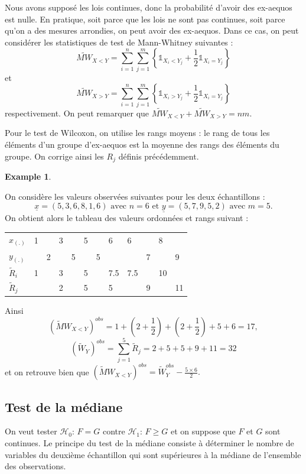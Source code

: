 \documentclass[
]{book}
\theoremstyle{definition}
\theoremstyle{definition}
\newtheorem{example}{Example}[chapter]
\theoremstyle{definition}
\theoremstyle{definition}
\theoremstyle{remark}
\begin{document}
Nous avons supposé les lois continues, donc la probabilité d'avoir des ex-aequos est nulle. En pratique, soit parce que les lois ne sont pas continues, soit parce qu'on a des mesures arrondies, on peut avoir des ex-aequos.
Dans ce cas, on peut considérer les statistiques de test de Mann-Whitney suivantes :
\[ 
    \tilde{MW}_{X<Y} = \sum_{i=1}^n \sum_{j=1}^m \left\{\mathbb{1}_{X_i <Y_j} + \frac 1 2 \mathbb{1}_{X_i =Y_j} \right\}
\]
et
\[ 
    \tilde{MW}_{X>Y} = \sum_{i=1}^n \sum_{j=1}^m \left\{\mathbb{1}_{X_i >Y_j} + \frac 1 2 \mathbb{1}_{X_i =Y_j} \right\}
\]
respectivement. On peut remarquer que \(\tilde{MW}_{X<Y} +\tilde{MW}_{X>Y} =nm\).

Pour le test de Wilcoxon, on utilise les rangs moyens : le rang de tous les éléments d'un groupe d'ex-aequos est la moyenne des rangs des éléments du groupe. On corrige ainsi les \(R_j\) définis précédemment.

\begin{example}
\protect\hypertarget{exm:unlabeled-div-35}{}\label{exm:unlabeled-div-35}

On considère les valeurs observées suivantes pour les deux échantillons :
\[
\underline{x} = (5,3,6,8,1,6) \textrm { avec } n=6
\textrm{ et }
\underline{y} = (5,7,9,5,2) \textrm { avec } m=5.
\]
On obtient alors le tableau des valeurs ordonnées et rangs suivant :

\begin{longtable}[]{@{}llllllllllll@{}}
\toprule
\endhead
\(x_{(.)}\) & 1 & & 3 & & 5 & & 6 & 6 & & 8 &\tabularnewline
\(y_{(.)}\) & & 2 & & 5 & & 5 & & & 7 & & 9\tabularnewline
\(\tilde R_i\) & 1 & & 3 & & 5 & & 7.5 & 7.5 & & 10 &\tabularnewline
\(\tilde R_j\) & & & 2 & & 5 & & 5 & & 9 & & 11\tabularnewline
\bottomrule
\end{longtable}

Ainsi
\[\left(\tilde MW_{X<Y} \right)^{obs} = 1 + (2+\frac 1 2) + (2+\frac 1 2) +5+6=17,\]
\[\left(\tilde W_Y\right)^{obs} = \sum_{j=1}^{5} \tilde R_j = 2+5+5+9+11=32\]
et on retrouve bien que \(\left(\tilde MW_{X<Y} \right)^{obs} =\tilde W_Y^{obs} - \frac{5\times 6}{2}.\)

\end{example}

\hypertarget{test-de-la-muxe9diane}{%
\subsection{Test de la médiane}\label{test-de-la-muxe9diane}}

On veut tester \(\mathcal{H}_0\): \(F=G\) contre \(\mathcal{H}_1\): \(F \geq G\) et on suppose que \(F\) et \(G\) sont continues.
Le principe du test de la médiane consiste à déterminer le nombre de variables du deuxième échantillon qui sont supérieures à la médiane de l'ensemble des observations.
\end{document}
